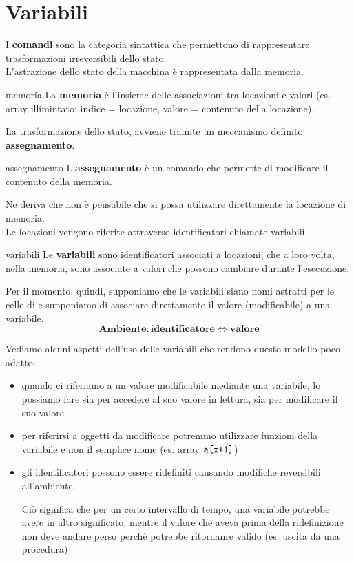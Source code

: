 
\chapter{Variabili}
I \textcolor{colore}{\textbf{comandi}} sono la categoria sintattica che permettono di rappresentare trasformazioni irreversibili dello stato.\\[0.2ex]
L'astrazione dello stato della macchina è rappresentata dalla memoria.

\begin{mydef}{memoria}
    La \textbf{memoria}  è l'insieme delle associazioni tra locazioni e valori (es. array illimintato: indice = locazione, valore = contenuto della locazione).
\end{mydef}

La trasformazione dello stato, avviene tramite un meccanismo definito \textbf{assegnamento}.

\begin{mydef}{assegnamento}
    L'\textbf{assegnamento} è un comando che permette di modificare il contenuto della memoria.
\end{mydef}

Ne deriva che non è pensabile che si possa utilizzare direttamente la locazione di memoria.\\[0.2ex]
Le locazioni vengono riferite attraverso identificatori chiamate variabili.

\begin{mydef}{variabili}
    Le \textbf{variabili} sono identificatori associati a locazioni, che a loro volta, nella memoria, sono associate a valori che possono cambiare durante l'esecuzione.
\end{mydef}

Per il momento, quindi, supponiamo che le variabili siano nomi astratti per le celle di e supponiamo di associare direttamente il valore (modificabile) a una variabile.
\[
    \mathbf{Ambiente : identificatore \Leftrightarrow valore}
\]

Vediamo alcuni aspetti dell'uso delle variabili che rendono questo modello poco adatto:
\begin{itemize}[label=$\triangleright$, itemsep=\medskipamount]
    \item quando ci riferiamo a un valore modificabile mediante una variabile, lo possiamo fare sia per accedere al suo valore in lettura, sia per modificare il suo valore
    \item per riferirsi a oggetti da modificare potremmo utilizzare funzioni della variabile e non il semplice nome (es. array $\verb|a[x+1]|$)
    \item gli identificatori possono essere ridefiniti causando modifiche reversibili all'ambiente.
    
    Ciò significa che per un certo intervallo di tempo, una variabile potrebbe avere in altro significato, mentre il valore che aveva prima della ridefinizione non deve andare perso perchè potrebbe ritornanre valido (es. uscita da una procedura)
\end{itemize}

